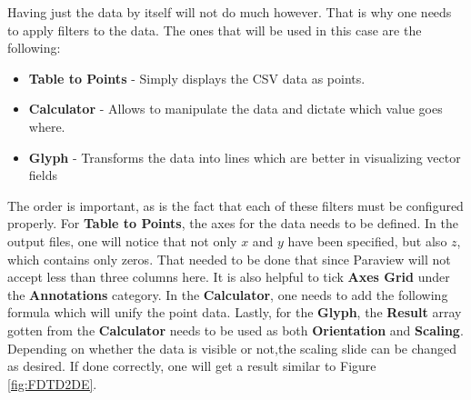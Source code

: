 Having just the data by itself will not do much however. That is why one needs to apply filters to the data. The ones that will be used in this case are the following:

\begin{itemize}
	\item \textbf{Table to Points} - Simply displays the CSV data as points.
	\item \textbf{Calculator} - Allows to manipulate the data and dictate which value goes where.
	\item \textbf{Glyph} - Transforms the data into lines which are better in visualizing vector fields
\end{itemize}

The order is important, as is the fact that each of these filters must be configured properly. For \textbf{Table to Points}, the axes for the data needs to be defined. In the output files, one will notice that not only $x$ and $y$ have been specified, but also $z$, which contains only zeros. That needed to be done that since Paraview will not accept less than three columns here. It is also helpful to tick \textbf{Axes Grid} under the \textbf{Annotations} category. In the \textbf{Calculator}, one needs to add the following formula  which will unify the point data. Lastly, for the \textbf{Glyph}, the \textbf{Result} array gotten from the \textbf{Calculator} needs to be used as both \textbf{Orientation} and \textbf{Scaling}. Depending on whether the data is visible or not,the scaling slide can be changed as desired. If done correctly, one will get a result similar to Figure \ref{fig:FDTD2DE}.

